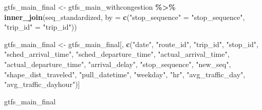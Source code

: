 \documentclass[
  12pt,
]{article}
\newenvironment{Shaded}{\begin{snugshade}}{\end{snugshade}}
\newcommand{\AttributeTok}[1]{\textcolor[rgb]{0.13,0.29,0.53}{#1}}
\newcommand{\FunctionTok}[1]{\textcolor[rgb]{0.13,0.29,0.53}{\textbf{#1}}}
\newcommand{\NormalTok}[1]{#1}
\newcommand{\OtherTok}[1]{\textcolor[rgb]{0.56,0.35,0.01}{#1}}
\newcommand{\SpecialCharTok}[1]{\textcolor[rgb]{0.81,0.36,0.00}{\textbf{#1}}}
\newcommand{\StringTok}[1]{\textcolor[rgb]{0.31,0.60,0.02}{#1}}
\begin{document}
\begin{Shaded}
\begin{Highlighting}[]
\NormalTok{gtfs\_main\_final }\OtherTok{\textless{}{-}}\NormalTok{ gtfs\_main\_withcongestion }\SpecialCharTok{\%\textgreater{}\%}
  \FunctionTok{inner\_join}\NormalTok{(seq\_standardized, }
            \AttributeTok{by =} \FunctionTok{c}\NormalTok{(}\StringTok{"stop\_sequence"} \OtherTok{=} \StringTok{"stop\_sequence"}\NormalTok{,}
                   \StringTok{"trip\_id"} \OtherTok{=} \StringTok{"trip\_id"}\NormalTok{))}

\NormalTok{gtfs\_main\_final }\OtherTok{\textless{}{-}}\NormalTok{ gtfs\_main\_final[, }\FunctionTok{c}\NormalTok{(}\StringTok{"date"}\NormalTok{,}
                                       \StringTok{"route\_id"}\NormalTok{,}
                                       \StringTok{"trip\_id"}\NormalTok{,}
                                       \StringTok{"stop\_id"}\NormalTok{,}
                                       \StringTok{"sched\_arrival\_time"}\NormalTok{,}
                                       \StringTok{"sched\_departure\_time"}\NormalTok{,}
                                       \StringTok{"actual\_arrival\_time"}\NormalTok{,}
                                       \StringTok{"actual\_departure\_time"}\NormalTok{,}
                                       \StringTok{"arrival\_delay"}\NormalTok{,}
                                       \StringTok{"stop\_sequence"}\NormalTok{,}
                                       \StringTok{"new\_seq"}\NormalTok{,}
                                       \StringTok{"shape\_dist\_traveled"}\NormalTok{,}
                                       \StringTok{"pull\_datetime"}\NormalTok{,}
                                       \StringTok{"weekday"}\NormalTok{,}
                                       \StringTok{"hr"}\NormalTok{,}
                                       \StringTok{"avg\_traffic\_day"}\NormalTok{,}
                                       \StringTok{"avg\_traffic\_dayhour"}\NormalTok{)]}

\NormalTok{gtfs\_main\_final}
\end{Highlighting}
\end{Shaded}
\end{document}
